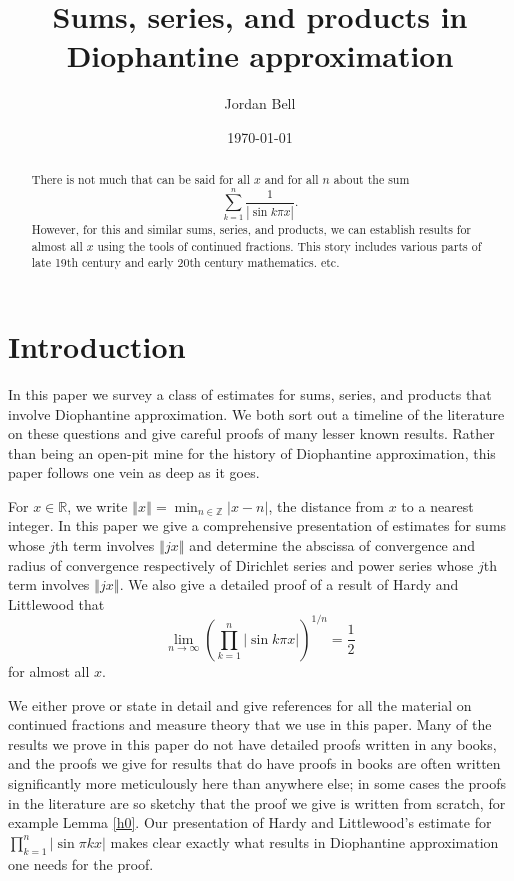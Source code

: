 \documentclass{amsart}
\newcommand{\norm}[1]{\left\Vert #1 \right\Vert}
\begin{document}
\title{Sums, series, and products in Diophantine approximation}
\author{Jordan Bell}
\address{Toronto, Ontario, Canada}
\date{\today}

\begin{abstract}
There is not much that can be said for all $x$ and for all $n$ about the sum
\[
\sum_{k=1}^n \frac{1}{|\sin k\pi x|}.
\]
However, for this and similar sums, series, and products, we can establish results for almost all $x$ using the tools of continued fractions. 
This story includes various parts of late 19th century and early 20th century mathematics. etc.
\end{abstract}

\maketitle

\section{Introduction}
In this paper we survey a class of estimates for sums, series, and products that involve Diophantine approximation.
We both sort out a timeline of the literature on these questions and give careful proofs of many lesser known results.
Rather than being an open-pit mine for the history of Diophantine approximation, this paper follows one vein as deep as it goes.

 
For $x \in \mathbb{R}$, we write $\norm{x}=\min_{n \in \mathbb{Z}} |x-n|$, the distance from $x$ to a nearest integer. 
In this paper we give a comprehensive presentation of estimates for sums whose $j$th term involves $\norm{jx}$ and
determine the abscissa of convergence and radius of convergence respectively of Dirichlet series and power series whose
$j$th term involves $\norm{jx}$. We also give a detailed proof of a result of Hardy and Littlewood that 
\[
\lim_{n \to \infty} \left( \prod_{k=1}^n |\sin k\pi x| \right)^{1/n} = \frac{1}{2}
\]
for almost all $x$. 


We either prove or state in detail and give references for all the material on continued fractions and measure theory that we use in this paper. 
Many of the results we prove in this paper do not have detailed proofs written in any books, and the proofs we give for results
that do have proofs in books are often written significantly more  meticulously here than anywhere else; in some cases the proofs
in the literature are so sketchy that the proof we give is written from scratch, for example Lemma \ref{h0}.
Our presentation of Hardy and Littlewood's estimate for
$\prod_{k=1}^n |\sin \pi kx|$  makes clear exactly what results in Diophantine approximation one needs for the proof.
\end{document}
